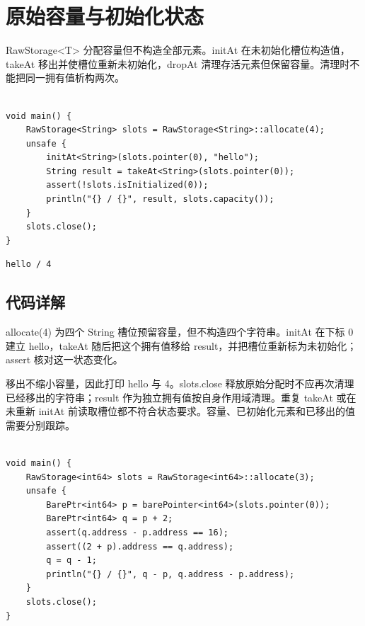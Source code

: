 \section{原始容量与初始化状态}

RawStorage<T> 分配容量但不构造全部元素。initAt 在未初始化槽位构造值，takeAt 移出并使槽位重新未初始化，dropAt 清理存活元素但保留容量。清理时不能把同一拥有值析构两次。

\par
\medskip
\begin{lstlisting}[style=chali]

void main() {
    RawStorage<String> slots = RawStorage<String>::allocate(4);
    unsafe {
        initAt<String>(slots.pointer(0), "hello");
        String result = takeAt<String>(slots.pointer(0));
        assert(!slots.isInitialized(0));
        println("{} / {}", result, slots.capacity());
    }
    slots.close();
}
\end{lstlisting}
\par
\medskip

\par
\medskip
\begin{lstlisting}[style=out]
hello / 4
\end{lstlisting}
\par
\medskip

\subsection*{代码详解}

allocate(4) 为四个 String 槽位预留容量，但不构造四个字符串。initAt 在下标 0 建立 hello，takeAt 随后把这个拥有值移给 result，并把槽位重新标为未初始化；assert 核对这一状态变化。

移出不缩小容量，因此打印 hello 与 4。slots.close 释放原始分配时不应再次清理已经移出的字符串；result 作为独立拥有值按自身作用域清理。重复 takeAt 或在未重新 initAt 前读取槽位都不符合状态要求。容量、已初始化元素和已移出的值需要分别跟踪。

\par
\medskip
\begin{lstlisting}[style=chali]

void main() {
    RawStorage<int64> slots = RawStorage<int64>::allocate(3);
    unsafe {
        BarePtr<int64> p = barePointer<int64>(slots.pointer(0));
        BarePtr<int64> q = p + 2;
        assert(q.address - p.address == 16);
        assert((2 + p).address == q.address);
        q = q - 1;
        println("{} / {}", q - p, q.address - p.address);
    }
    slots.close();
}
\end{lstlisting}
\par
\medskip

